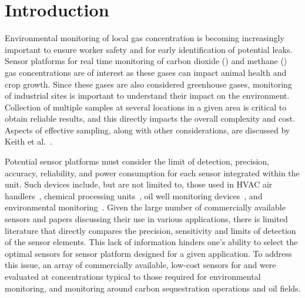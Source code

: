 \documentclass[sensors,article,submit,moreauthors,pdftex]{Definitions/mdpi}
\begin{document}
	
	\section{Introduction}
	\label{sec:intro}
		
		Environmental monitoring of local gas concentration is becoming increasingly important to ensure worker safety and for early identification of potential leaks.
		Sensor platforms for real time monitoring of carbon dioxide () and methane () gas concentrations are of interest as these gases can impact animal health and crop growth.
		Since these gases are also considered greenhouse gases, monitoring of industrial sites is important to understand their impact on the environment.
		Collection of multiple samples at several locations in a given area is critical to obtain reliable results, and this directly impacts the overall complexity and cost.
		Aspects of effective sampling, along with other considerations, are discussed by Keith et al.~\cite{keith_principles_1983}.
		
		Potential sensor platforms must consider the limit of detection, precision, accuracy, reliability, and power consumption for each sensor integrated within the unit.
		Such devices include, but are not limited to, those used in HVAC air handlers~\cite{yang_systematic_2014,chung_selective_2008}, chemical processing units~\cite{won_nonlinear_2012}, oil well monitoring devices~\cite{yi_remote_2010,somov_deployment_2013}, and environmental monitoring~\cite{pering_high_2014,black_formation_2012,guohua_study_2012,karunanithi_performance_2009,shendell_outdoor_2012}.
		Given the large number of commercially available sensors and papers discussing their use in various applications, there is limited literature that directly compares the precision, sensitivity and limits of detection of the sensor elements.
		This lack of information hinders one's ability to select the optimal sensors for sensor platform designed for a given application.
		To address this issue, an array of commercially available, low-cost sensors for  and  were evaluated at concentrations typical to those required for environmental monitoring, and monitoring around carbon sequestration operations and oil fields.
		
\end{document}
